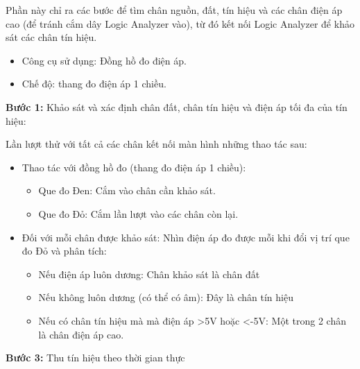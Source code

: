 Phần này chỉ ra các bước để tìm chân nguồn, đất, tín hiệu và các chân điện áp cao (để tránh cắm dây Logic Analyzer vào), từ đó kết nối Logic Analyzer để khảo sát các chân tín hiệu.

\begin{itemize}
    \item Công cụ sử dụng: Đồng hồ đo điện áp. 
    \item Chế độ: thang đo điện áp 1 chiều.
\end{itemize}



\textbf{Bước 1:} Khảo sát và xác định chân đất, chân tín hiệu và điện áp tối đa của tín hiệu:

Lần lượt thử với tất cả các chân kết nối màn hình những thao tác sau: 

\begin{itemize}
    \item Thao tác với đồng hồ đo (thang đo điện áp 1 chiều):
    \begin{itemize}
        \item Que đo Đen: Cắm vào chân cần khảo sát.
        \item  Que đo Đỏ: Cắm lần lượt vào các chân còn lại.
    \end{itemize} 

    \item Đối với mỗi chân được khảo sát: Nhìn điện áp đo được mỗi khi đổi vị trí que đo Đỏ và phân tích:
    \begin{itemize}
        \item Nếu điện áp luôn dương: Chân khảo sát là chân đất
        \item Nếu không luôn dương (có thể có âm): Đây là chân tín hiệu
        \item Nếu có chân tín hiệu mà mà điện áp >5V hoặc <-5V: Một trong 2 chân là chân điện áp cao.
        



    \end{itemize}
    


\end{itemize}

\textbf{Bước 3:} Thu tín hiệu theo thời gian thực 

